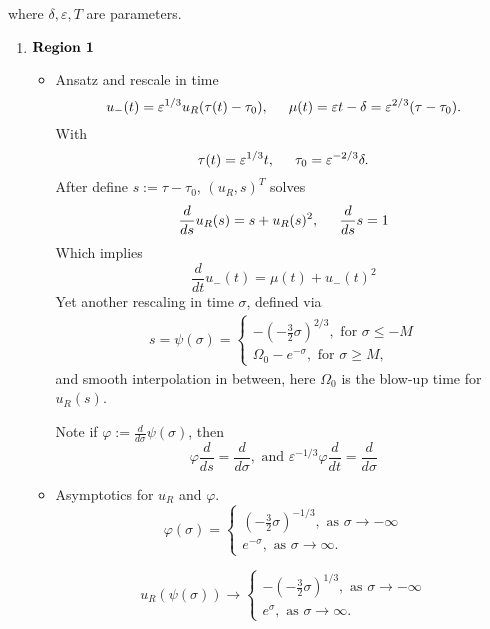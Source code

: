 \documentclass[letterpaper,11pt]{article}
\newcommand{\eps}{\varepsilon}
\numberwithin{equation}{section}
\theoremstyle{plain}
\begin{document}
where $\delta,\eps, T$ are parameters.
\begin{enumerate}
\item $\mathbf{Region \hspace{0.05in}1} $
\begin{itemize}
\item Ansatz and rescale in time
\[
u_-(t)= \eps^{1/3}u_R(\tau(t)-\tau_0), \hspace{0.2in}\mu(t) = \eps t -\delta = \eps^{2/3}(\tau-\tau_0).
\] 
With 
\[
\tau(t)=\eps^{1/3}t, \hspace{0.2in} \tau_0 = \eps^{-2/3}\delta.
\]
After define $s:= \tau-\tau_0$, $(u_R, s)^T$ solves
\[
\frac{d}{ds} u_R(s) = s+u_R(s)^2, \hspace{0.2in} \frac{d}{ds} s=1 
\]
Which implies 
\[
\frac{d}{dt} u_-(t) = \mu(t) + u_-(t)^2
\]
Yet another rescaling in time $\sigma$, defined via 
\begin{align*}
s = \psi(\sigma) =\begin{cases}
-(-\frac{3}{2} \sigma)^{2/3} , \text{ for }\sigma \le -M\\
\Omega_0 -e^{-\sigma}, \text{ for }\sigma \ge M,
\end{cases}
\end{align*}
and smooth interpolation in between, here $\Omega_0$ is the blow-up time for $u_R(s)$. 

Note if $\varphi:=\frac{d}{d\sigma}\psi(\sigma)$, then
\[
\varphi\frac{d}{ds} = \frac{d}{d\sigma}, \text{ and }\eps^{-1/3}\varphi \frac{d}{dt} = \frac{d}{d\sigma}
\]
\item Asymptotics for $u_R$ and $\varphi$.
\begin{equation*}
\varphi(\sigma) =\begin{cases}
 (-\frac{3}{2}\sigma)^{-1/3}, \text{ as }\sigma \to -\infty\\
e^{-\sigma} , \text{ as }\sigma \to \infty.
\end{cases}
\end{equation*}

\begin{equation*}
u_R(\psi(\sigma)) \to \begin{cases}
 -(-\frac{3}{2}\sigma)^{1/3}, \text{ as }\sigma \to -\infty\\
e^{\sigma} , \text{ as }\sigma \to \infty.
\end{cases}
\end{equation*}


\end{itemize}
\end{enumerate}
\end{document}
